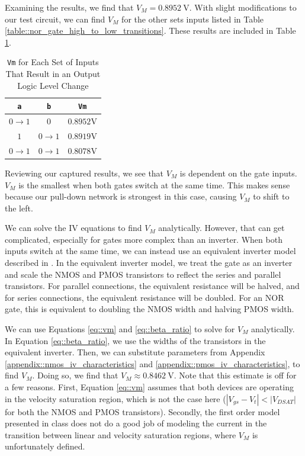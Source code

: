 \documentclass{article}
\begin{document}
	Examining the results, we find that $V_M = 0.8952\ \text{V}$. With slight modifications to our test circuit, we can find $V_M$ for the other sets inputs listed in Table \ref{table::nor_gate_high_to_low_transitions}. These results are included in Table \ref{table::nor_gate_vm}.
	
	\begin{table}[H]
	\begin{center}
	\caption{\texttt{Vm} for Each Set of Inputs That Result in an Output Logic Level Change}
	\label{table::nor_gate_vm}
	\begin{tabular}{| c | c | c |}
		\hline
		\texttt{a} & \texttt{b} & \texttt{Vm}\\
		\hline	
		$0 \rightarrow 1$ & $0$ & $0.8952 \text{V}$\\
		\hline	
		$1$ & $0 \rightarrow 1$ & $0.8919 \text{V}$\\
		\hline	
		$0 \rightarrow 1$ & $0 \rightarrow 1$ & $0.8078 \text{V}$\\
		\hline
	\end{tabular}
	\end{center}
	\end{table}
	
	Reviewing our captured results, we see that $V_M$ is dependent on the gate inputs. $V_M$ is the smallest when both gates switch at the same time. This makes sense because our pull-down network is strongest in this case, causing $V_M$ to shift to the left.
	
	We can solve the IV equations to find $V_M$ analytically. However, that can get complicated, especially for gates more complex than an inverter. When both inputs switch at the same time, we can instead use an equivalent inverter model described in \cite{cmos_vlsi_design, equivalent_inverter, inverter_dc_analysis}. In the equivalent inverter model, we treat the gate as an inverter and scale the NMOS and PMOS transistors to reflect the series and parallel transistors. For parallel connections, the equivalent resistance will be halved, and for series connections, the equivalent resistance will be doubled. For an NOR gate, this is equivalent to doubling the NMOS width and halving PMOS width.
	
	\noindent We can use Equations \ref{eq::vm} and \ref{eq::beta_ratio} to solve for $V_M$ analytically. In Equation \ref{eq::beta_ratio}, we use the widths of the transistors in the equivalent inverter. Then, we can substitute parameters from Appendix \ref{appendix::nmos_iv_characteristics} and \ref{appendix::pmos_iv_characteristics}, to find $V_M$. Doing so, we find that $V_M \approx 0.8462\ \text{V}$. Note that this estimate is off for a few reasons. First, Equation \ref{eq::vm} assumes that both devices are operating in the velocity saturation region, which is not the case here ($|V_{gs} - V_t| < |V_{DSAT}|$ for both the NMOS and PMOS transistors). Secondly, the first order model presented in class does not do a good job of modeling the current in the transition between linear and velocity saturation regions, where $V_M$ is unfortunately defined.
	
\end{document}
